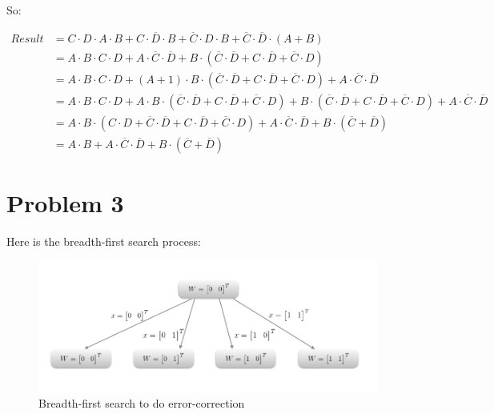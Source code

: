 \documentclass[paper=a4, fontsize=11pt]{scrartcl} %
\numberwithin{equation}{section} %
\numberwithin{figure}{section} %
\numberwithin{table}{section} %
\begin{document}
So:

\begin{align*}
Result&= C \cdot D \cdot A \cdot B + 
         C \cdot \overline{D} \cdot B +
         \overline{C} \cdot D \cdot B +
         \overline{C} \cdot \overline{D} \cdot (A + B)\\
      &= A \cdot B \cdot C \cdot D + 
         A \cdot \overline{C} \cdot \overline{D} +
         B \cdot (\overline{C} \cdot \overline{D} + C \cdot \overline{D} + \overline{C} \cdot D)\\
      &= A \cdot B \cdot C \cdot D + 
         (A + 1) \cdot B \cdot (\overline{C} \cdot \overline{D} + C \cdot \overline{D} + \overline{C} \cdot D) +
         A \cdot \overline{C} \cdot \overline{D}\\
      &= A \cdot B \cdot C \cdot D + 
         A \cdot B \cdot (\overline{C} \cdot \overline{D} + C \cdot \overline{D} + \overline{C} \cdot D) +
         B \cdot (\overline{C} \cdot \overline{D} + C \cdot \overline{D} + \overline{C} \cdot D) +
         A \cdot \overline{C} \cdot \overline{D} \\
      &= A \cdot B \cdot (C \cdot D + \overline{C} \cdot \overline{D} + C \cdot \overline{D} + \overline{C} \cdot D) +
         A \cdot \overline{C} \cdot \overline{D} +
         B \cdot (\overline{C} + \overline{D})\\
      &= A \cdot B +
         A \cdot \overline{C} \cdot \overline{D} +
         B \cdot (\overline{C} + \overline{D}) 
\end{align*}



\section{Problem 3}

Here is the breadth-first search process:

\begin{figure}[h]
    \includegraphics[scale=0.5]{image5.png}
    \caption{Breadth-first search to do error-correction}
    \label{fig:Problem3.1}
\end{figure}
\end{document}
